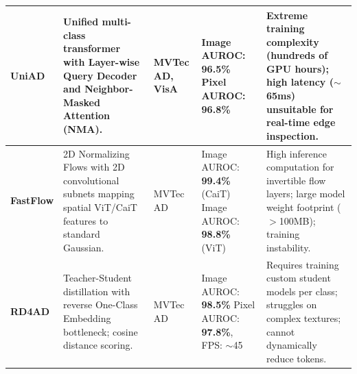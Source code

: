 \documentclass[10pt,journal,compsoc]{IEEEtran}
\begin{document}
\begin{table}[t]
\begin{tabularx}{\textwidth}{l p{4.2cm} p{1.6cm} p{2.8cm} X}
\midrule
\textbf{UniAD} \cite{you2022uniad} & Unified multi-class transformer with Layer-wise Query Decoder and Neighbor-Masked Attention (NMA). & MVTec AD, VisA & Image AUROC: \textbf{96.5\%} \newline Pixel AUROC: \textbf{96.8\%} & Extreme training complexity (hundreds of GPU hours); high latency ($\sim$65ms) unsuitable for real-time edge inspection. \\
\midrule
\textbf{FastFlow} \cite{yu2021fastflow} & 2D Normalizing Flows with 2D convolutional subnets mapping spatial ViT/CaiT features to standard Gaussian. & MVTec AD & Image AUROC: \textbf{99.4\%} (CaiT) \newline Image AUROC: \textbf{98.8\%} (ViT) & High inference computation for invertible flow layers; large model weight footprint ($>$100MB); training instability. \\
\midrule
\textbf{RD4AD} \cite{deng2022anomaly} & Teacher-Student distillation with reverse One-Class Embedding bottleneck; cosine distance scoring. & MVTec AD & Image AUROC: \textbf{98.5\%} \newline Pixel AUROC: \textbf{97.8\%}, FPS: $\sim$45 & Requires training custom student models per class; struggles on complex textures; cannot dynamically reduce tokens. \\
\bottomrule
\end{tabularx}
\end{table}
\end{document}
